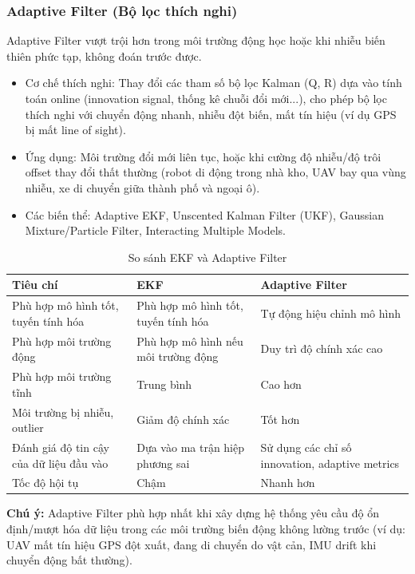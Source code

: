 \subsubsection{Adaptive Filter (Bộ lọc thích nghi)}
Adaptive Filter vượt trội hơn trong môi trường động học hoặc khi nhiễu biến thiên phức tạp, không đoán trước được.
\begin{itemize}
    \item Cơ chế thích nghi: Thay đổi các tham số bộ lọc Kalman (Q, R) dựa vào tính toán online (innovation signal, thống kê chuỗi đổi mới...), cho phép bộ lọc thích nghi với chuyển động nhanh, nhiễu đột biến, mất tín hiệu (ví dụ GPS bị mất line of sight).
    \item Ứng dụng: Môi trường đổi mới liên tục, hoặc khi cường độ nhiễu/độ trôi offset thay đổi thất thường (robot di động trong nhà kho, UAV bay qua vùng nhiễu, xe di chuyển giữa thành phố và ngoại ô).
    \item Các biến thể: Adaptive EKF, Unscented Kalman Filter (UKF), Gaussian Mixture/Particle Filter, Interacting Multiple Models.
\end{itemize}
\begin{table}[h!]
\centering
\begin{tabular}{|l|p{5cm}|p{5cm}|}
\hline
\textbf{Tiêu chí} & \textbf{EKF} & \textbf{Adaptive Filter} \\
\hline
Phù hợp mô hình tốt, tuyến tính hóa & Phù hợp mô hình tốt, tuyến tính hóa & Tự động hiệu chỉnh mô hình \\
\hline
Phù hợp môi trường động & Phù hợp mô hình nếu môi trường động & Duy trì độ chính xác cao \\
\hline
Phù hợp môi trường tĩnh & Trung bình & Cao hơn \\
\hline
Môi trường bị nhiễu, outlier & Giảm độ chính xác & Tốt hơn \\
\hline
Đánh giá độ tin cậy của dữ liệu đầu vào & Dựa vào ma trận hiệp phương sai & Sử dụng các chỉ số innovation, adaptive metrics \\
\hline
Tốc độ hội tụ & Chậm & Nhanh hơn \\
\hline
\end{tabular}
\caption{So sánh EKF và Adaptive Filter}
\end{table}

\noindent\textbf{Chú ý:} Adaptive Filter phù hợp nhất khi xây dựng hệ thống yêu cầu độ ổn định/mượt hóa dữ liệu trong các môi trường biến động không lường trước (ví dụ: UAV mất tín hiệu GPS đột xuất, đang di chuyển do vật cản, IMU drift khi chuyển động bất thường).

